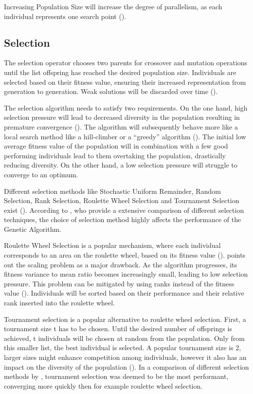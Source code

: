 Increasing Population Size will increase the degree of parallelism, as each individual represents one search point (\cite{mills_determining_2015}).

\subsection{Selection}
The selection operator chooses two parents for crossover and mutation operations until the list offspring has reached the desired population size. 
Individuals are selected based on their fitness value, ensuring their increased representation from generation to generation. Weak solutions will be discarded over time (\cite{srinivas_genetic_1994}).

The selection algorithm needs to satisfy two requirements. 
On the one hand, high selection pressure will lead to decreased diversity in the population resulting in premature convergence (\cite{katoch_review_2021}). The algorithm will subsequently behave more like a local search method like a hill-climber or a “greedy” algorithm (\cite{kacprzyk_parameter_2007}). The initial low average fitness value of the population will in combination with a few good performing individuals lead to them overtaking the population, drastically reducing diversity.
On the other hand, a low selection pressure will struggle to converge to an optimum.

Different selection methods like Stochastic Uniform Remainder, Random Selection, Rank Selection, Roulette Wheel Selection and Tournament Selection exist (\cite{majumdar_genetic_2015}). According to \cite{hussain_trade-off_2020}, who provide a extensive comparison of different selection techniques, the choice of selection method highly affects the performance of the Genetic Algorithm.

Roulette Wheel Selection is a popular mechanism, where each individual corresponds to an area on the roulette wheel, based on its fitness value (). \cite{grefenstette_optimization_1986} points out the scaling problem as a major drawback. As the algorithm progresses, its fitness variance to mean ratio becomes increasingly small, leading to low selection pressure.
This problem can be mitigated by using ranks instead of the fitness value (\cite{katoch_review_2021}). Individuals will be sorted based on their performance and their relative rank inserted into the roulette wheel. 

Tournament selection is a popular alternative to roulette wheel selection. First, a tournament size t has to be chosen. Until the desired number of offsprings is achieved, t individuals will be chosen at random from the population. Only from this smaller list, the best individual is selected. A popular tournament size is 2, larger sizes might enhance competition among individuals, however it also has an impact on the diversity of the population (\cite{hussain_trade-off_2020}). In a comparison of different selection methods by \cite{jinghui_zhong_comparison_2005}, tournament selection was deemed to be the most performant, converging more quickly then for example roulette wheel selection.

